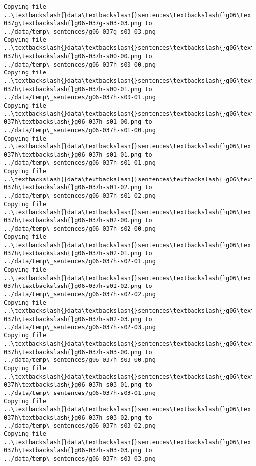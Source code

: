 \documentclass[11pt]{article}
\begin{document}
\begin{Verbatim}[commandchars=\\\{\}]
Copying file ..\textbackslash{}data\textbackslash{}sentences\textbackslash{}g06\textbackslash{}g06-037g\textbackslash{}g06-037g-s03-03.png to
../data/temp\_sentences/g06-037g-s03-03.png
Copying file ..\textbackslash{}data\textbackslash{}sentences\textbackslash{}g06\textbackslash{}g06-037h\textbackslash{}g06-037h-s00-00.png to
../data/temp\_sentences/g06-037h-s00-00.png
Copying file ..\textbackslash{}data\textbackslash{}sentences\textbackslash{}g06\textbackslash{}g06-037h\textbackslash{}g06-037h-s00-01.png to
../data/temp\_sentences/g06-037h-s00-01.png
Copying file ..\textbackslash{}data\textbackslash{}sentences\textbackslash{}g06\textbackslash{}g06-037h\textbackslash{}g06-037h-s01-00.png to
../data/temp\_sentences/g06-037h-s01-00.png
Copying file ..\textbackslash{}data\textbackslash{}sentences\textbackslash{}g06\textbackslash{}g06-037h\textbackslash{}g06-037h-s01-01.png to
../data/temp\_sentences/g06-037h-s01-01.png
Copying file ..\textbackslash{}data\textbackslash{}sentences\textbackslash{}g06\textbackslash{}g06-037h\textbackslash{}g06-037h-s01-02.png to
../data/temp\_sentences/g06-037h-s01-02.png
Copying file ..\textbackslash{}data\textbackslash{}sentences\textbackslash{}g06\textbackslash{}g06-037h\textbackslash{}g06-037h-s02-00.png to
../data/temp\_sentences/g06-037h-s02-00.png
Copying file ..\textbackslash{}data\textbackslash{}sentences\textbackslash{}g06\textbackslash{}g06-037h\textbackslash{}g06-037h-s02-01.png to
../data/temp\_sentences/g06-037h-s02-01.png
Copying file ..\textbackslash{}data\textbackslash{}sentences\textbackslash{}g06\textbackslash{}g06-037h\textbackslash{}g06-037h-s02-02.png to
../data/temp\_sentences/g06-037h-s02-02.png
Copying file ..\textbackslash{}data\textbackslash{}sentences\textbackslash{}g06\textbackslash{}g06-037h\textbackslash{}g06-037h-s02-03.png to
../data/temp\_sentences/g06-037h-s02-03.png
Copying file ..\textbackslash{}data\textbackslash{}sentences\textbackslash{}g06\textbackslash{}g06-037h\textbackslash{}g06-037h-s03-00.png to
../data/temp\_sentences/g06-037h-s03-00.png
Copying file ..\textbackslash{}data\textbackslash{}sentences\textbackslash{}g06\textbackslash{}g06-037h\textbackslash{}g06-037h-s03-01.png to
../data/temp\_sentences/g06-037h-s03-01.png
Copying file ..\textbackslash{}data\textbackslash{}sentences\textbackslash{}g06\textbackslash{}g06-037h\textbackslash{}g06-037h-s03-02.png to
../data/temp\_sentences/g06-037h-s03-02.png
Copying file ..\textbackslash{}data\textbackslash{}sentences\textbackslash{}g06\textbackslash{}g06-037h\textbackslash{}g06-037h-s03-03.png to
../data/temp\_sentences/g06-037h-s03-03.png

\end{Verbatim}
\end{document}
